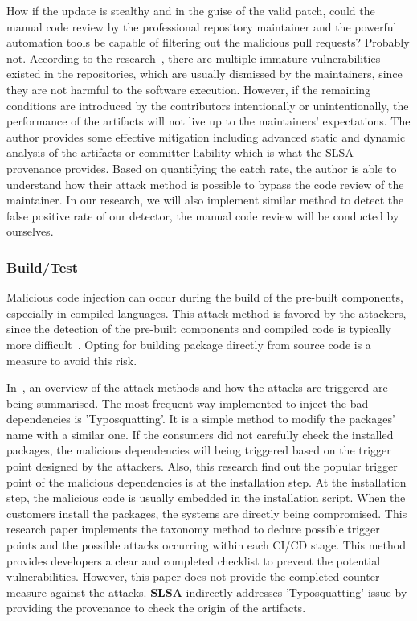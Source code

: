 How if the update is stealthy and in the guise of the valid patch, could the manual code review by the 
professional repository maintainer and the powerful automation tools be capable of filtering out the 
malicious pull requests? Probably not. According to the research~\cite{wu2021feasibility},
there are multiple immature vulnerabilities existed in the repositories, which are usually dismissed by the maintainers, 
since they are not harmful to the software execution. However, if the remaining conditions are introduced by
the contributors intentionally or unintentionally, the performance of the artifacts will not live up to the 
maintainers' expectations. 
The author provides some effective mitigation including advanced static and dynamic analysis of the artifacts or
committer liability which is what the SLSA provenance provides. Based on quantifying the catch rate, the author is
able to understand how their attack method is possible to bypass the code review of the maintainer. In our research, 
we will also implement similar method to detect the false positive rate of our detector, the manual code review will
be conducted by ourselves.  

\subsubsection{Build/Test}
Malicious code injection can occur during the build of the pre-built components, especially in compiled languages.
This attack method is favored by the attackers, since the detection of the pre-built components and compiled code is 
typically more difficult~\cite{ladisa2023journey}. Opting for building package directly from 
source code is a measure to avoid this risk.

In~\cite{ohm2020backstabber}, 
an overview of the attack methods and how the attacks are triggered are being summarised. 
The most frequent way implemented to inject the bad dependencies is 'Typosquatting'. It is a simple method
to modify the packages' name with a similar one. If the consumers did not carefully check the installed 
packages, the malicious dependencies will being triggered based on the trigger point designed by the 
attackers. 
Also, this research find out the popular trigger point of the malicious dependencies is at the
installation step. At the installation step, the malicious code is usually embedded in the installation
script. When the customers install the packages, the systems are directly being compromised.  
This research paper implements the taxonomy method to deduce possible trigger points and 
the possible attacks occurring within each CI/CD stage. This method provides developers a clear 
and completed checklist to prevent the potential vulnerabilities. However, this paper does not
provide the completed counter measure against the attacks.
\textbf{SLSA} indirectly addresses 'Typosquatting' issue by providing the provenance to check the origin of
the artifacts. 

